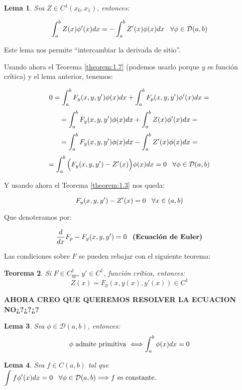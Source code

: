 \documentclass[12pt]{article}
\newtheorem{theorem}{Teorema}
\newtheorem{lemma}[theorem]{Lema}
\theoremstyle{definition}
\theoremstyle{remark}
\newcommand{\soportecompacto}{\mathcal{D}(a,b)}
\newcommand{\xcero}{(a,b)}
\begin{document}
\begin{lemma}
Sea $Z\in C^1(x_0,x_1)$, entonces:

\[
\integral{a}{b}{Z(x)\phi'(x)dx}=-\integral{a}{b}{Z'(x)\phi(x)dx} \espacio \forall \phi\in\soportecompacto
\]
\end{lemma}

Este lema nos permite \enquote{intercambiar la derivada de sitio}.

Usando ahora el Teorema \ref{theorem:1.7} (podemos usarlo porque $y$ es función crítica) y el lema anterior, tenemos:

\[
0=\displaystyle\int_{ a }^{ b } F_y(x,y, y')\phi(x)dx+\displaystyle\int_{ a }^{ b } F_p(x,y,y')\phi'(x)dx= 
\]
\[
=\displaystyle\int_{ a }^{ b } F_y(x,y, y')\phi(x)dx+\displaystyle\int_{ a }^{ b } Z(x)\phi'(x)dx=
\]
\[
=\displaystyle\int_{ a }^{ b } F_y(x,y, y')\phi(x)dx-\displaystyle\int_{ a }^{ b } Z'(x)\phi(x)dx=
\]
\[
=\integral{a}{b}{\Big(F_y(x,y, y')-Z'(x)\Big)}\phi(x)dx=0 \espacio \forall\phi\in\soportecompacto
\]

Y usando ahora el Teorema \ref{theorem:1.3} nos queda:

\[
F_y(x,y,y')-Z'(x)=0 \espacio \forall x \in\xcero
\]

Que denoteramos por:

\[
\frac{d}{dx}F_p-F_y(x,y,y')=0 \;\;\; \textbf{(Ecuación de Euler)}
\]

Las condiciones sobre $F$ se pueden rebajar con el siguiente teorema:

\begin{theorem} 

Si $F\in C^1_{yp}$, $y'\in C^1$, función crítica, entonces:
\[
Z(x)=F_p(x,y(x),y'(x))\in C^1
\]
\end{theorem}

\textbf{AHORA CREO QUE QUEREMOS RESOLVER LA ECUACION NO¿?¿?¿?}


\begin{lemma}
Sea $\phi\in\mathcal{D}(a,b)$, entonces:
\[
\phi \text{ admite primitiva } \Longleftrightarrow \displaystyle\int_{ a }^{ b } \phi(x)dx=0
\]
\end{lemma}

\begin{lemma}
Sea $f\in C(a,b)$ tal que $\displaystyle\int_{  }^{  } f\phi'(x)dx=0\;\;\;\forall\phi\in\mathcal{D}(a,b)\Longrightarrow f \text{ es constante.}$
\end{lemma}
\end{document}
